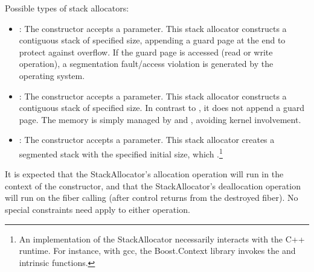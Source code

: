 Possible types of stack allocators:
\begin{itemize}
    \item {}: The constructor accepts a 
          parameter. This stack allocator constructs a contiguous stack of
          specified size, appending a guard page at the end to protect against
          overflow. If the guard page is accessed (read or write operation), a
          segmentation fault/access violation is generated by the operating
          system.
    \item {}: The constructor accepts a  parameter.
          This stack allocator constructs a contiguous stack of specified size.
          In contrast to , it does not append a guard
          page. The memory is simply managed by 
          and , avoiding kernel involvement.
    \item {}: The constructor accepts a  parameter.
          This stack allocator creates a segmented stack\cite{gccsplit} with the
          specified initial size, which .\footnote{An
          implementation of the  StackAllocator necessarily
          interacts with the C++ runtime. For instance, with gcc, the
          Boost.Context\cite{bcontext} library invokes
          the 
          and  intrinsic
          functions.\cite{splitalloc}}
\end{itemize}

It is expected that the StackAllocator's allocation operation will run in the
context of the \fiber constructor, and that the StackAllocator's deallocation
operation will run on the fiber calling \dtor (after control returns from the
destroyed fiber). No special constraints need apply to either operation.
